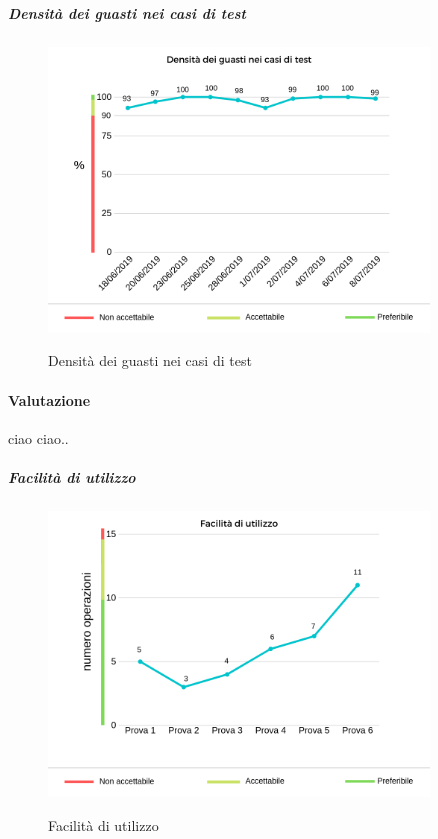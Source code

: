 	\subparagraph{Densità dei guasti nei casi di test}
	\begin{center}
		\begin{figure}[h] 
			\centering 
			\includegraphics[width=0.90\textwidth]{res/images/new/densitaGuasti.png}\\
			\caption{Densità dei guasti nei casi di test}
		\end{figure}
	\end{center}
	\paragraph*{Valutazione} ciao ciao..
	\pagebreak
	\subparagraph{Facilità di utilizzo}
	\begin{center}
		\begin{figure}[h] 
			\centering 
			\includegraphics[width=0.90\textwidth]{res/images/new/facilitaUtilizzo.png}\\
			\caption{Facilità di utilizzo}
		\end{figure}
	\end{center}
